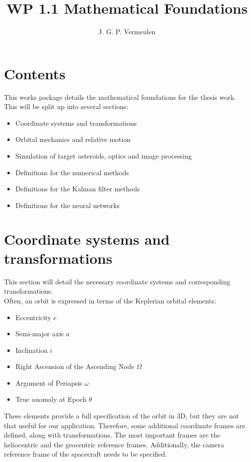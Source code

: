 \documentclass[a4paper,10pt]{article}
\title{WP 1.1 Mathematical Foundations}
\author{J. G. P. Vermeulen}
\begin{document}
\maketitle

\section{Contents}

This works package details the mathematical foundations for the thesis work. This will be split up into several sections:
\begin{itemize}
\item Coordinate systems and transformations
\item Orbital mechanics and relative motion
\item Simulation of target asteroids, optics and image processing
\item Definitions for the numerical methods
\item Definitions for the Kalman filter methods
\item Definitions for the neural networks
\end{itemize}

\section{Coordinate systems and transformations}
This section will detail the necessary coordinate systems and corresponding transformations.\\

Often, an orbit is expressed in terms of the Keplerian orbital elements:
\begin{itemize}
\item Eccentricity $e$
\item Semi-major axis $a$
\item Inclination $i$
\item Right Ascension of the Ascending Node $\Omega$
\item Argument of Periapsis $\omega$
\item True anomaly at Epoch $\theta$
\end{itemize}

These elements provide a full specification of the orbit in 3D, but they are not that useful for our application. Therefore, some additional coordinate frames are defined, along with transformations. The most important frames are the heliocentric and the geocentric reference frames. Additionally, the camera reference frame of the spacecraft needs to be specified.
\end{document}
